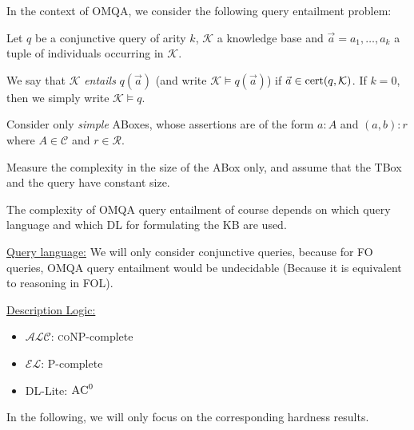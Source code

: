 In the context of OMQA, we consider the following query entailment problem:
\begin{definition}
	Let $q$ be a conjunctive query of arity $k$, $\mathcal{K}$ a knowledge base
	and $\vec{a} = a_1, \ldots, a_k$ a tuple of individuals occurring in $\mathcal{K}$.

	We say that $\mathcal{K}$ \textit{entails} $q(\vec{a})$ (and write $\mathcal{K} \vDash q(\vec{a})$)
	if $\vec{a} \in \operatorname{\text{cert}}(q, \mathcal{K})$.
	If $k=0$, then we simply write $\mathcal{K} \vDash q$.
\end{definition}

\begin{mdframed}[frametitle= Data complexity in OMQA]
	Consider only \textit{simple} ABoxes, whose assertions are of the form
	$a:A$ and $(a,b):r$ where $A \in \mathscr{C}$ and $r \in \mathscr{R}$.

	Measure the complexity in the size of the ABox only,
	and assume that the TBox and the query have constant size.
\end{mdframed}

The complexity of OMQA query entailment of course depends on which query language
and which DL for formulating the KB are used.

\underline{Query language:}
\newline
We will only consider conjunctive queries,
because for FO queries, OMQA query entailment would be undecidable
(Because it is equivalent to reasoning in FOL).

\underline{Description Logic:}
\begin{itemize}
	\item $\mathcal{ALC}$: \textsc{coNP}-complete
	\item $\mathcal{EL}$: \textsc{P}-complete
	\item DL-Lite: $\textsc{AC}^0$
\end{itemize}
In the following, we will only focus on the corresponding hardness results.


